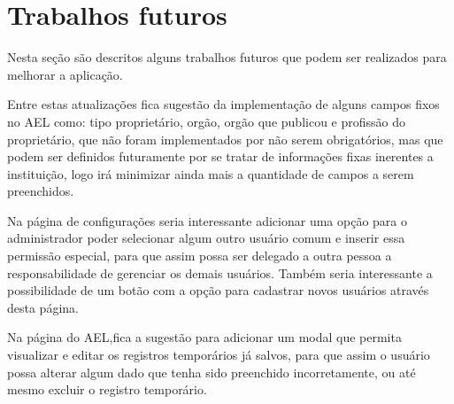 \section{Trabalhos futuros}
Nesta seção são descritos alguns trabalhos futuros que podem ser realizados para melhorar a aplicação.

Entre estas atualizações fica sugestão da implementação de alguns campos fixos no AEL como: tipo proprietário, orgão, orgão que publicou e profissão do proprietário, que não foram implementados por não serem obrigatórios, mas que podem ser definidos futuramente por se tratar de informações fixas inerentes a instituição, logo irá minimizar ainda mais a quantidade de campos a serem preenchidos.

Na página de configurações seria interessante adicionar uma opção para o administrador poder selecionar algum outro usuário comum e inserir essa permissão especial, para que assim possa ser delegado a outra pessoa a responsabilidade de gerenciar os demais usuários. Também seria interessante a possibilidade de um botão com a opção para cadastrar novos usuários através desta página.

Na página do AEL,fica a sugestão para adicionar um modal que permita visualizar e editar os registros temporários já salvos, para que assim o usuário possa alterar algum dado que tenha sido preenchido incorretamente, ou até mesmo excluir o registro temporário.



